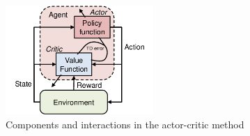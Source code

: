 \begin{figure}[H]
  \centering
  \includegraphics[width=0.5\textwidth]{figures/images/actor_critic_architecture.png}
  \caption[Actor-critic architecture]{Components and interactions in the actor-critic method \cite{fuji2018deep}}
  \label{fig:actor_critic_architecture}
\end{figure}
